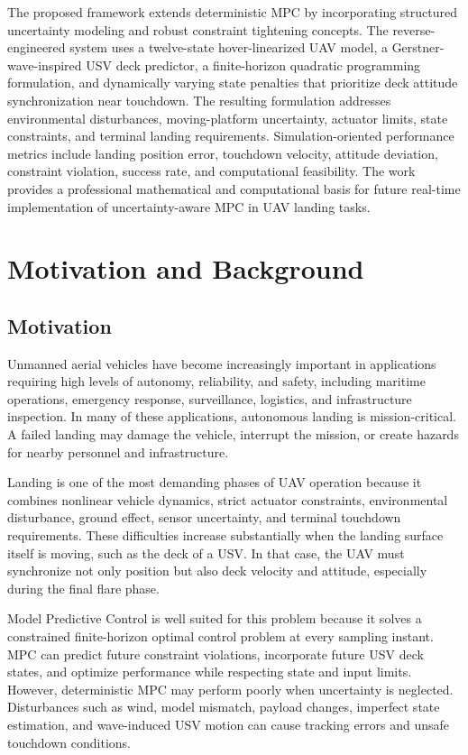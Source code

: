 \documentclass[12pt,a4paper]{report}
\begin{document}
The proposed framework extends deterministic MPC by incorporating structured uncertainty modeling and robust constraint tightening concepts. The reverse-engineered system uses a twelve-state hover-linearized UAV model, a Gerstner-wave-inspired USV deck predictor, a finite-horizon quadratic programming formulation, and dynamically varying state penalties that prioritize deck attitude synchronization near touchdown. The resulting formulation addresses environmental disturbances, moving-platform uncertainty, actuator limits, state constraints, and terminal landing requirements. Simulation-oriented performance metrics include landing position error, touchdown velocity, attitude deviation, constraint violation, success rate, and computational feasibility. The work provides a professional mathematical and computational basis for future real-time implementation of uncertainty-aware MPC in UAV landing tasks.

\tableofcontents
\listoftables
\listoffigures
\newpage
{}

\chapter{Motivation and Background}

\section{Motivation}
Unmanned aerial vehicles have become increasingly important in applications requiring high levels of autonomy, reliability, and safety, including maritime operations, emergency response, surveillance, logistics, and infrastructure inspection. In many of these applications, autonomous landing is mission-critical. A failed landing may damage the vehicle, interrupt the mission, or create hazards for nearby personnel and infrastructure.

Landing is one of the most demanding phases of UAV operation because it combines nonlinear vehicle dynamics, strict actuator constraints, environmental disturbance, ground effect, sensor uncertainty, and terminal touchdown requirements. These difficulties increase substantially when the landing surface itself is moving, such as the deck of a USV. In that case, the UAV must synchronize not only position but also deck velocity and attitude, especially during the final flare phase.

Model Predictive Control is well suited for this problem because it solves a constrained finite-horizon optimal control problem at every sampling instant. MPC can predict future constraint violations, incorporate future USV deck states, and optimize performance while respecting state and input limits. However, deterministic MPC may perform poorly when uncertainty is neglected. Disturbances such as wind, model mismatch, payload changes, imperfect state estimation, and wave-induced USV motion can cause tracking errors and unsafe touchdown conditions.
\end{document}
